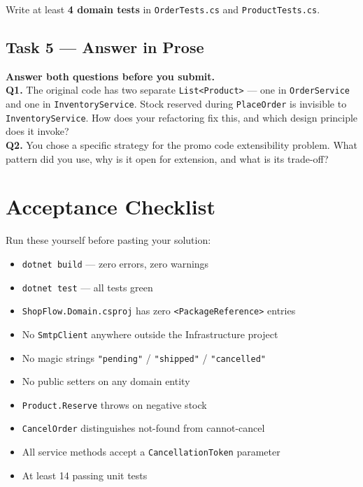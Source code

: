 \documentclass[11pt,a4paper]{article}
\begin{document}
Write at least \textbf{4 domain tests} in \texttt{OrderTests.cs}
and \texttt{ProductTests.cs}.

\subsection{Task 5 --- Answer in Prose}

\begin{notebox}
\textbf{Answer both questions before you submit.}\\[6pt]
\textbf{Q1.} The original code has two separate \texttt{List<Product>} ---
one in \texttt{OrderService} and one in \texttt{InventoryService}.
Stock reserved during \texttt{PlaceOrder} is invisible to
\texttt{InventoryService}. How does your refactoring fix this,
and which design principle does it invoke?\\[8pt]
\textbf{Q2.} You chose a specific strategy for the promo code extensibility problem.
What pattern did you use, why is it open for extension,
and what is its trade-off?
\end{notebox}

\section{Acceptance Checklist}

Run these yourself before pasting your solution:

\begin{greenbox}
\begin{itemize}[leftmargin=1.2em,itemsep=4pt]
  \item[$\square$] \texttt{dotnet build} --- zero errors, zero warnings
  \item[$\square$] \texttt{dotnet test} --- all tests green
  \item[$\square$] \texttt{ShopFlow.Domain.csproj} has zero \texttt{<PackageReference>} entries
  \item[$\square$] No \texttt{SmtpClient} anywhere outside the Infrastructure project
  \item[$\square$] No magic strings \texttt{"pending"} / \texttt{"shipped"} / \texttt{"cancelled"}
  \item[$\square$] No public setters on any domain entity
  \item[$\square$] \texttt{Product.Reserve} throws on negative stock
  \item[$\square$] \texttt{CancelOrder} distinguishes not-found from cannot-cancel
  \item[$\square$] All service methods accept a \texttt{CancellationToken} parameter
  \item[$\square$] At least 14 passing unit tests
\end{itemize}
\end{greenbox}
\end{document}
